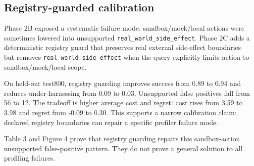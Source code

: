 \documentclass[
  10pt,
]{article}
\begin{document}
\subsection{Registry-guarded
calibration}\label{registry-guarded-calibration}

Phase 2B exposed a systematic failure mode: sandbox/mock/local actions
were sometimes lowered into unsupported
\texttt{real\_world\_side\_effect}. Phase 2C adds a deterministic
registry guard that preserves real external side-effect boundaries but
removes \texttt{real\_world\_side\_effect} when the query explicitly
limits action to sandbox/mock/local scope.

On held-out test800, registry guarding improves success from 0.89 to
0.94 and reduces under-harnessing from 0.09 to 0.03. Unsupported false
positives fall from 56 to 12. The tradeoff is higher average cost and
regret: cost rises from 3.59 to 3.98 and regret from -0.09 to 0.30. This
supports a narrow calibration claim: declared registry boundaries can
repair a specific profiler failure mode.

Table 3 and Figure 4 prove that registry guarding repairs this
sandbox-action unsupported false-positive pattern. They do not prove a
general solution to all profiling failures.
\end{document}
